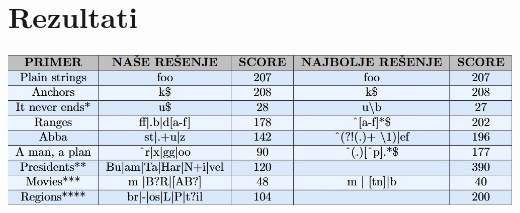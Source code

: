 \section{Rezultati}
    
    \frame{\sectionpage}
    
    \begin{frame}{}
        \begin{center}
            \includegraphics[scale=0.45]{chapters/tabel.jpg}
        \end{center}
    \end{frame}
